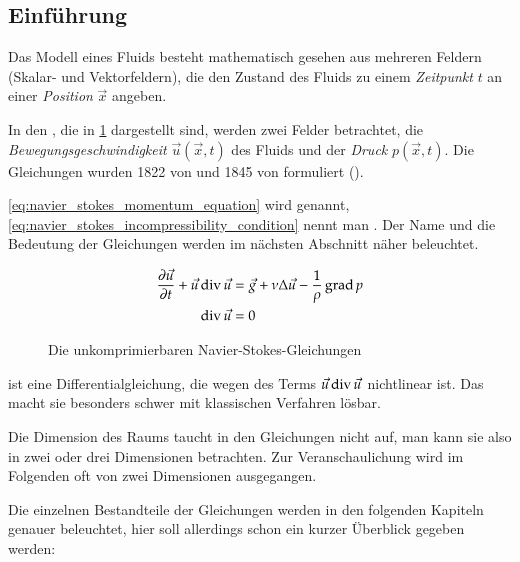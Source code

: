 \subsection{Einführung}

Das Modell eines Fluids besteht mathematisch gesehen aus mehreren Feldern
(Skalar- und Vektorfeldern), die den Zustand des Fluids zu einem
\emph{Zeitpunkt} $t$ an einer \emph{Position} $\vec{x}$ angeben.

In den , die in
\cref{eq:navier_stokes_equation} dargestellt sind, werden zwei
Felder betrachtet, die \emph{Bewegungsgeschwindigkeit}
$\vec{u}(\vec{x},t)$ des Fluids und der \emph{Druck}
$p(\vec{x},t)$. Die Gleichungen wurden 1822 von
 und 1845 von  formuliert (\cite{Muller2003}).

\cref{eq:navier_stokes_momentum_equation} wird
 genannt,
\cref{eq:navier_stokes_incompressibility_condition} nennt man
. Der Name und die Bedeutung der
Gleichungen werden im nächsten Abschnitt näher beleuchtet.

\begin{figure}[h]
\begin{align}
\label{eq:navier_stokes_momentum_equation}
\frac{
	\partial
	\vec{u}
}
{
	\partial t
} +
\vec{u} \operatorname*{div} \vec{u}
& =
\vec{g} +
\nu \Delta \vec{u} -
\frac{
	1
}
{
	\rho
}
\operatorname*{grad} p
\\
\label{eq:navier_stokes_incompressibility_condition}
\operatorname*{div} \vec{u} & = 0
\end{align}
\caption{Die unkomprimierbaren Navier-Stokes-Gleichungen}
\label{eq:navier_stokes_equation}
\end{figure}

 ist eine Differentialgleichung, die
wegen des Terms $\vec{u} \operatorname*{div} \vec{u}$ nichtlinear ist. Das macht sie
besonders schwer mit klassischen Verfahren lösbar.

Die Dimension des Raums taucht in den Gleichungen nicht auf, man kann sie also
in zwei oder drei Dimensionen betrachten. Zur Veranschaulichung wird im
Folgenden oft von zwei Dimensionen ausgegangen.

Die einzelnen Bestandteile der Gleichungen werden in den folgenden
Kapiteln genauer beleuchtet, hier soll allerdings schon ein kurzer
Überblick gegeben werden:

